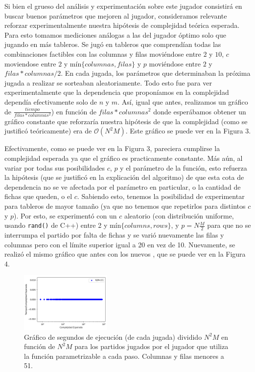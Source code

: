 \documentclass[A4paper,oneside,fleqn,11pt]{article}
\theoremstyle{definition}
\begin{document}
Si bien el grueso del análisis y experimentación sobre este jugador consistirá en buscar buenos parámetros que mejoren al jugador, consideramos relevante reforzar experimentalmente nuestra hipótesis de complejidad teórica esperada. Para esto tomamos mediciones análogas a las del jugador óptimo solo que jugando en más tableros. Se jugó en tableros que comprendían todas las combinaciones factibles con las columnas y filas moviéndose entre $2$ y $10$, $c$ moviendose entre $2$ y mín$\{columnas,filas\}$ y $p$ moviéndose entre $2$ y $filas*columnas/2$. En cada jugada, los parámetros que determinaban la próxima jugada a realizar se sorteaban aleatoriamente. Todo esto fue para ver experimentalmente que la dependencia que proponíamos en la complejidad dependía efectivamente solo de $n$ y $m$. Así, igual que antes, realizamos un gráfico de $\frac{tiempo}{filas*columnas^2}$) en función de $filas*columnas^2$ donde esperábamos obtener un gráfico constante que reforzaría nuestra hipótesis de que la complejidad (como se justificó teóricamente) era de $\mathcal{O}(N^2 M)$. Este gráfico se puede ver en la Figura 3.




Efectivamente, como se puede ver en la Figura 3, pareciera cumplirse la complejidad esperada ya que el gráfico es practicamente constante. Más aún, al variar por todas sus posibilidades $c$, $p$ y el parámetro de la función, esto refuerza la hipótesis (que se justificó en la explicación del algoritmo) de que esta cota de dependencia no se ve afectada por el parámetro en particular, o la cantidad de fichas que queden, o el $c$. Sabiendo esto, tenemos la posibilidad de experimentar para tableros de mayor tamaño (ya que no tenemos que repetirlos para distintos $c$ y $p$). Por esto, se experimentó con un $c$ aleatorio (con distribución uniforme, usando \texttt{rand()} de C++) entre 2 y mín$\{columns,rows\}$, y $p=N\frac{M}{2}$ para que no se interrumpa el partido por falta de fichas y se varió nuevamente las filas y columnas pero con el límite superior igual a 20 en vez de 10. Nuevamente, se realizó el mismo gráfico que antes con los nuevos , que se puede ver en la Figura 4.

\begin{figure}
	\includegraphics[width=0.4\textwidth]{complejidad2b.png}
	\caption{ Gráfico de segundos de ejecución (de cada jugada) dividido $N^2 M$ en función de $N^2  M$ para los partidos jugados por el jugador que utiliza la función parametrizable a cada paso. Columnas y filas menores a 51.}
\end{figure}
\end{document}
